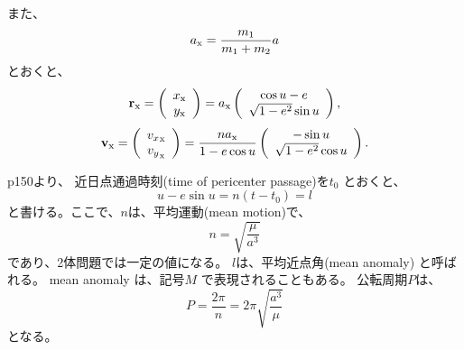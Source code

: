 また、
\begin{equation}
  a_{\rm x} = \frac{m_1}{m_1 + m_2} a
\end{equation}
とおくと、
\begin{equation}
{\bf r}_{\rm x} = 
\left( \begin{array}{c}
x_{\rm x} \\
y_{\rm x} \\
\end{array}
\right)
= a_{\rm x}
\left( \begin{array}{c}
\cos u - e \\
\sqrt{1 - e^2} \sin u \\
\end{array}
\right),
\end{equation}
\begin{equation}
{\bf v}_{\rm x} = 
\left( \begin{array}{c}
{v_x}_{\rm x} \\
{v_y}_{\rm x} \\
\end{array}
\right)
= \frac{n a_{\rm x}}{1 - e \cos u} 
\left( \begin{array}{c}
-\sin u \\
\sqrt{1 - e^2} \cos u \\
\end{array}
\right).
\end{equation}


p150より、
近日点通過時刻(time of pericenter passage)を$t_0$ とおくと、
\begin{equation}
  u - e \sin u = n (t - t_0) = l
\end{equation}
と書ける。ここで、$n$は、平均運動(mean motion)で、
\begin{equation}
  n = \sqrt{ \frac{\mu}{a^3} }
\end{equation} 
であり、2体問題では一定の値になる。
$l$は、平均近点角(mean anomaly) と呼ばれる。
mean anomaly は、記号$M$ で表現されることもある。
公転周期$P$は、
\begin{equation}
  P = \frac{2 \pi}{n} = 2 \pi \sqrt{\frac{a^3}{\mu}}
\end{equation}
となる。

